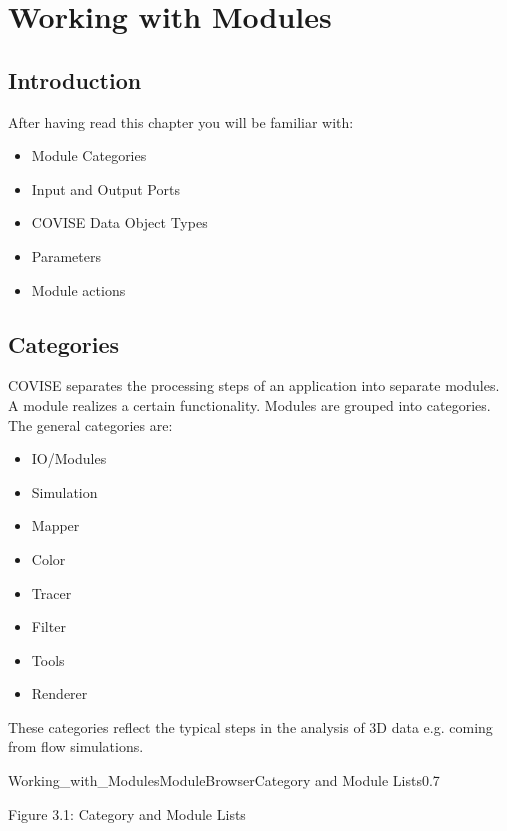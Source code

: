 
\begin{htmlonly}

\end{htmlonly}


\startdocument
\chapter{Working with Modules}
\label{Working_with_Modules}

\section{Introduction}

After having read this chapter you will be familiar with:

\begin{itemize}
\item Module Categories
\item Input and Output Ports
\item COVISE Data Object Types
\item Parameters
\item Module actions
\end{itemize}

\section{Categories}

COVISE separates the processing steps of an application into separate modules. A module realizes a certain
functionality. Modules are grouped into categories. The general categories are:

\begin{itemize}
\item IO/Modules
\item Simulation
\item Mapper
\item Color
\item Tracer
\item Filter
\item Tools
\item Renderer
\end{itemize}

These categories reflect the typical steps in the analysis of 3D data e.g. coming from 
flow simulations.

\begin{covimg}{Working_with_Modules}{ModuleBrowser}{Category and Module Lists}{0.7}\end{covimg}
\begin{htmlonly}
Figure 3.1: Category and Module Lists
\vspace{0.5cm}
\end{htmlonly}


